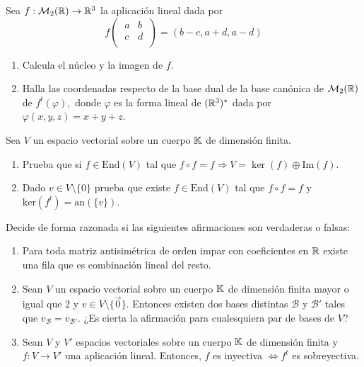 \documentclass[12pt]{article}
\begin{document}
    \begin{ejercicio}[2.5 puntos] Sea $f : \mathcal{M}_2({\mathbb{R}}) \rightarrow {\mathbb{R}}^3$ la aplicación lineal dada por
    \begin{equation*}
        f\begin{pmatrix}
            \ a & b \ \\
            \ c & d \ \\
        \end{pmatrix} = (b-c , a+d, a-d)
    \end{equation*}
    \begin{enumerate}[label=(\alph*)]
        \item Calcula el núcleo y la imagen de $f$.
        \item Halla las coordenadas respecto de la base dual de la base canónica de $\mathcal{M}_2({\mathbb{R}})$ de $f^t(\varphi),$ donde $\varphi$ es la forma lineal de $({\mathbb{R}}^3)^*$ dada por $\varphi(x, y, z) = x + y + z$.
    \end{enumerate}
    \end{ejercicio}

    \begin{ejercicio}[2.5 puntos]
        Sea $V$ un espacio vectorial sobre un cuerpo ${\mathbb{K}}$ de dimensión finita.
        \begin{enumerate}[label=(\alph*)]
        \item Prueba que si $f \in \text{End}(V)$ tal que $f \circ f = f \Rightarrow V = \ker(f) \oplus \text{Im}(f).$
        \item Dado $v \in V \setminus \{0\}$ prueba que existe $f \in \text{End}(V)$ tal que $f \circ f = f$ y $\text{ker}(f^t) = \text{an}(\{v\})$.
        \end{enumerate}
    \end{ejercicio}

    \begin{ejercicio}[2.5 puntos]
        Decide de forma razonada si las siguientes afirmaciones son verdaderas o falsas:
        \begin{enumerate}[label=(\alph*)]
            \item Para toda matriz antisimétrica de orden impar con coeficientes en ${\mathbb{R}}$ existe una fila que es combinación lineal del resto.
            \item Sean $V$ un espacio vectorial sobre un cuerpo ${\mathbb{K}}$ de dimensión finita mayor o igual que 2 y $v \in V \setminus \{\vec{0}\}.$ Entonces existen dos bases distintas $\mathcal{B}$ y $\mathcal{B'}$ tales que $v_{\mathcal{B}} = v_{\mathcal{B'}}$. ¿Es cierta la afirmación para cualesquiera par de bases de $V$?
            \item Sean $V$ y $V'$ espacios vectoriales sobre un cuerpo ${\mathbb{K}}$ de dimensión finita y $f: V \rightarrow V'$ una aplicación lineal. Entonces, $f$ es inyectiva $\Leftrightarrow f^t$ es sobreyectiva. 
        \end{enumerate}
    \end{ejercicio}
\end{document}
